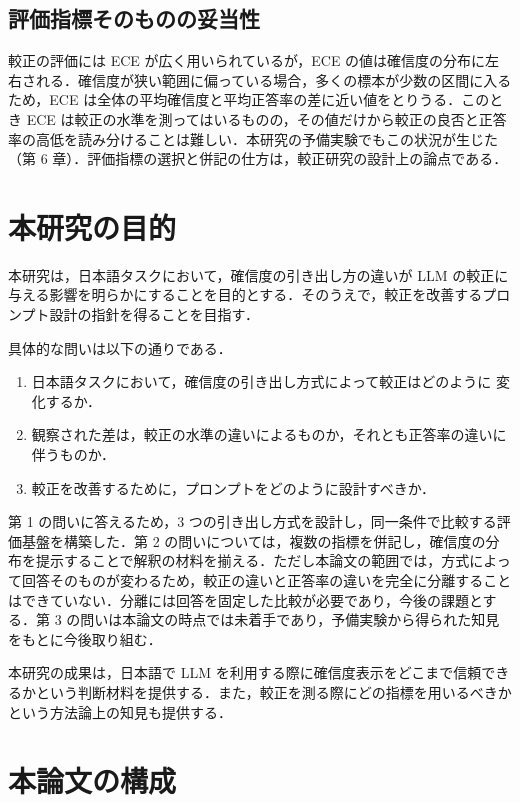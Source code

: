 \subsection{評価指標そのものの妥当性}

較正の評価には ECE が広く用いられているが，ECE の値は確信度の分布に左右される．確信度が狭い範囲に偏っている場合，多くの標本が少数の区間に入るため，ECE は全体の平均確信度と平均正答率の差に近い値をとりうる．このとき ECE は較正の水準を測ってはいるものの，その値だけから較正の良否と正答率の高低を読み分けることは難しい．本研究の予備実験でもこの状況が生じた（第 6 章）．評価指標の選択と併記の仕方は，較正研究の設計上の論点である．

\section{本研究の目的}

本研究は，日本語タスクにおいて，確信度の引き出し方の違いが LLM の較正に与える影響を明らかにすることを目的とする．そのうえで，較正を改善するプロンプト設計の指針を得ることを目指す．

具体的な問いは以下の通りである．

\begin{enumerate}
\item 日本語タスクにおいて，確信度の引き出し方式によって較正はどのように
変化するか．

\item 観察された差は，較正の水準の違いによるものか，それとも正答率の違いに
伴うものか．

\item 較正を改善するために，プロンプトをどのように設計すべきか．
\end{enumerate}

第 1 の問いに答えるため，3 つの引き出し方式を設計し，同一条件で比較する評価基盤を構築した．第 2 の問いについては，複数の指標を併記し，確信度の分布を提示することで解釈の材料を揃える．ただし本論文の範囲では，方式によって回答そのものが変わるため，較正の違いと正答率の違いを完全に分離することはできていない．分離には回答を固定した比較が必要であり，今後の課題とする．第 3 の問いは本論文の時点では未着手であり，予備実験から得られた知見をもとに今後取り組む．

本研究の成果は，日本語で LLM を利用する際に確信度表示をどこまで信頼できるかという判断材料を提供する．また，較正を測る際にどの指標を用いるべきかという方法論上の知見も提供する．

\section{本論文の構成}

